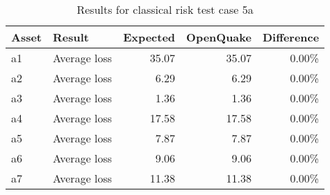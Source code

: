 \begin{table}[htbp]

\centering
\begin{tabular}{ l l r r r }

\hline
\rowcolor{anti-flashwhite}
\bf{Asset} & \bf{Result} & \bf{Expected} & \bf{OpenQuake} & \bf{Difference}\\
\hline
a1 & Average loss & 35.07 & 35.07 & 0.00\% \\
a2 & Average loss & 6.29 & 6.29 & 0.00\% \\
a3 & Average loss & 1.36 & 1.36 & 0.00\% \\
a4 & Average loss & 17.58 & 17.58 & 0.00\% \\
a5 & Average loss & 7.87 & 7.87 & 0.00\% \\
a6 & Average loss & 9.06 & 9.06 & 0.00\% \\
a7 & Average loss & 11.38 & 11.38 & 0.00\% \\
\hline
\end{tabular}

\caption{Results for classical risk test case 5a}
\label{tab:result-cr-5a}
\end{table}